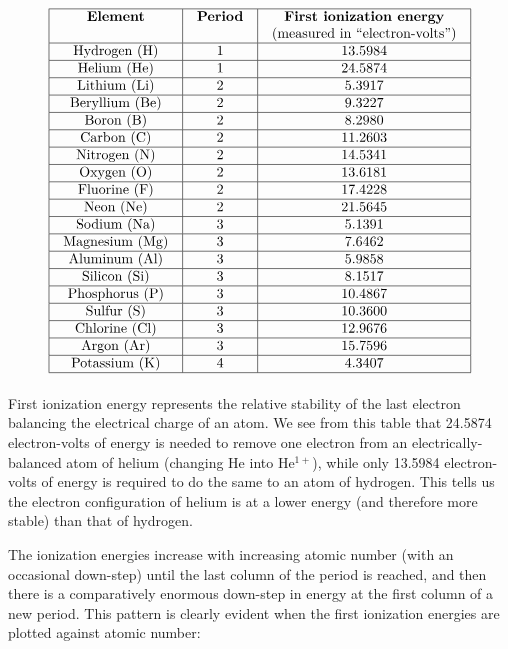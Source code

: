 
$$\vbox{\offinterlineskip
\halign{\strut
\vrule \quad\hfil # \ \hfil & 
\vrule \quad\hfil # \ \hfil & 
\vrule \quad\hfil # \ \hfil \vrule \cr
\noalign{\hrule}
%
\textbf{Element} & \textbf{Period} & \textbf{First ionization energy} \cr
 &  & (measured in ``electron-volts'') \cr
%
\noalign{\hrule}
%
Hydrogen (H) & 1 & 13.5984 \cr
%
\noalign{\hrule}
%
Helium (He) & 1 & 24.5874 \cr
%
\noalign{\hrule}
%
Lithium (Li) & 2 & 5.3917 \cr
%
\noalign{\hrule}
%
Beryllium (Be) & 2 & 9.3227 \cr
%
\noalign{\hrule}
%
Boron (B) & 2 & 8.2980 \cr
%
\noalign{\hrule}
%
Carbon (C) & 2 & 11.2603 \cr
%
\noalign{\hrule}
%
Nitrogen (N) & 2 & 14.5341 \cr
%
\noalign{\hrule}
%
Oxygen (O) & 2 & 13.6181 \cr
%
\noalign{\hrule}
%
Fluorine (F) & 2 & 17.4228 \cr
%
\noalign{\hrule}
%
Neon (Ne) & 2 & 21.5645 \cr
%
\noalign{\hrule}
%
Sodium (Na) & 3 & 5.1391 \cr
%
\noalign{\hrule}
%
Magnesium (Mg) & 3 & 7.6462 \cr
%
\noalign{\hrule}
%
Aluminum (Al) & 3 & 5.9858 \cr
%
\noalign{\hrule}
%
Silicon (Si) & 3 & 8.1517 \cr
%
\noalign{\hrule}
%
Phosphorus (P) & 3 & 10.4867 \cr
%
\noalign{\hrule}
%
Sulfur (S) & 3 & 10.3600 \cr
%
\noalign{\hrule}
%
Chlorine (Cl) & 3 & 12.9676 \cr
%
\noalign{\hrule}
%
Argon (Ar) & 3 & 15.7596 \cr
%
\noalign{\hrule}
%
Potassium (K) & 4 & 4.3407 \cr
%
\noalign{\hrule}
} %
}$$ %

First ionization energy represents the relative stability of the last electron balancing the electrical charge of an atom.  We see from this table that 24.5874 electron-volts of energy is needed to remove one electron from an electrically-balanced atom of helium (changing He into He$^{1+}$), while only 13.5984 electron-volts of energy is required to do the same to an atom of hydrogen.  This tells us the electron configuration of helium is at a lower energy (and therefore more stable) than that of hydrogen.

\filbreak

The ionization energies increase with increasing atomic number (with an occasional down-step) until the last column of the period is reached, and then there is a comparatively enormous down-step in energy at the first column of a new period.  This pattern is clearly evident when the first ionization energies are plotted against atomic number:


